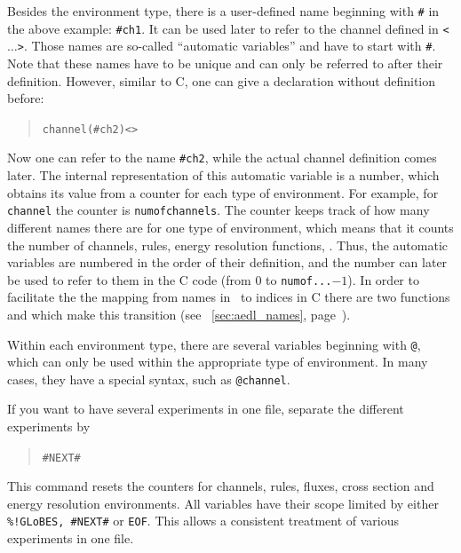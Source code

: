 Besides the environment type, there is a user-defined name 
beginning with {\tt \#}
in the above example: {\tt \#ch1}. It can be used later to refer to the 
channel defined in {\tt <$\ldots$>}. Those names are so-called 
``automatic variables'' and have to start with {\tt \#}. Note that these names have to be unique and can only be referred to after their definition.
However, similar to C, one can give a declaration without definition before:
\begin{quote}
{\tt    channel(\#ch2)<>}
\end{quote}
Now one can refer to the name {\tt \#ch2}, while the actual channel definition comes later. The internal representation of this automatic
variable is a number, which obtains its value from a counter for each type of environment. For example, for {\tt channel} the counter is {\tt numofchannels}. The counter keeps track of how many different names 
there are for one type of environment, which means that it counts the number of channels, rules, energy resolution functions, \etc . Thus, the automatic
variables are numbered in the order of their definition, and the number
can later be used to refer to them in the C code (from $0$ to {\tt numof...}$-1$). In order to facilitate the the mapping from names in \AEDL\ to indices
in C there are two functions  and  which
make this transition (see \Sec~\ref{sec:aedl_names}, 
page~\pageref{sec:aedl_names}).


Within each environment type, there are several 
variables beginning with {\tt @}, which can only be used within the 
appropriate type of environment. In many cases, 
they have a special syntax, such as {\tt @channel}.

If you want to have several experiments in one file, separate the different
 experiments by 
\begin{quote}
{\tt    \#NEXT\#}
\end{quote}
This command resets the counters for channels, rules, fluxes, cross section 
and energy resolution environments. All variables have their scope limited 
by either {\tt \%!GLoBES, \#NEXT\#} or {\tt EOF}.  This allows 
a consistent treatment of various experiments in one file.

